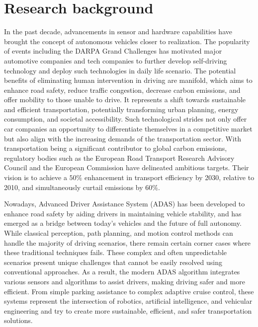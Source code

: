 \chapter{\leavevmode\newline Research background}
\label{chap:chapter3}

In the past decade, advancements in sensor and hardware capabilities have brought the concept of autonomous vehicles closer to realization. The popularity of events including the DARPA Grand Challenges \parencite{buehler20072005}\parencite{buehler2009darpa} has motivated major automotive companies and tech companies to further develop self-driving technology and deploy such technologies in daily life scenario. The potential benefits of eliminating human intervention in driving are manifold, which aims to enhance road safety, reduce traffic congestion, decrease carbon emissions, and offer mobility to those unable to drive. It represents a shift towards sustainable and efficient transportation, potentially transforming urban planning, energy consumption, and societal accessibility. Such technological strides not only offer car companies an opportunity to differentiate themselves in a competitive market but also align with the increasing demands of the transportation sector. With transportation being a significant contributor to global carbon emissions, regulatory bodies such as the European Road Transport Research Advisory Council and the European Commission have delineated ambitious targets. Their vision is to achieve a $50 \%$ enhancement in transport efficiency by 2030, relative to 2010, and simultaneously curtail emissions by $60 \%$. 

Nowadays, Advanced Driver Assistance System (ADAS) has been developed to enhance road safety by aiding drivers in maintaining vehicle stability, and has emerged as a bridge between today's vehicles and the future of full autonomy. While classical perception, path planning, and motion control methods can handle the majority of driving scenarios, there remain certain corner cases where these traditional techniques fails. These complex and often unpredictable scenarios present unique challenges that cannot be easily resolved using conventional approaches. As a result, the modern ADAS algorithm integrates various sensors and algorithms to assist drivers, making driving safer and more efficient. From simple parking assistance to complex adaptive cruise control, these systems represent the intersection of robotics, artificial intelligence, and vehicular engineering and try to create more sustainable, efficient, and safer transportation solutions.


